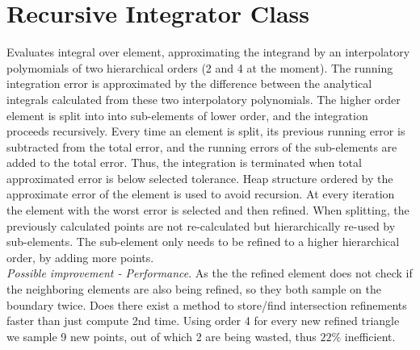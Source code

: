 \section{Recursive Integrator Class}

Evaluates integral over element, approximating the integrand by an interpolatory polymomials of two hierarchical orders (2 and 4 at the moment). The running integration error is approximated by the difference between the analytical integrals calculated from these two interpolatory polynomials. The higher order element is split into into sub-elements of lower order, and the integration proceeds recursively. Every time an element is split, its previous running error is subtracted from the total error, and the running errors of the sub-elements are added to the total error. Thus, the integration is terminated when total approximated error is below selected tolerance. Heap structure ordered by the approximate error of the element is used to avoid recursion. At every iteration the element with the worst error is selected and then refined. When splitting, the previously calculated points are not re-calculated but hierarchically re-used by sub-elements. The sub-element only needs to be refined to a higher hierarchical order, by adding more points. \\

\noindent
\textit{Possible improvement - Performance}. As the the refined element does not check if the neighboring elements are also being refined, so they both sample on the boundary twice. Does there exist a method to store/find intersection refinements faster than just compute 2nd time. Using order 4 for every new refined triangle we sample 9 new points, out of which 2 are being wasted, thus $22\%$ inefficient.

